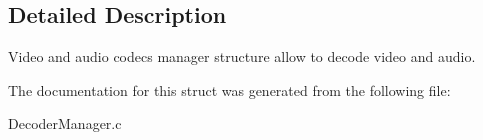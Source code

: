 \subsection{Detailed Description}
Video and audio codecs manager structure allow to decode video and audio. 

The documentation for this struct was generated from the following file\+:\begin{DoxyCompactItemize}
\item 
Decoder\+Manager.\+c\end{DoxyCompactItemize}
